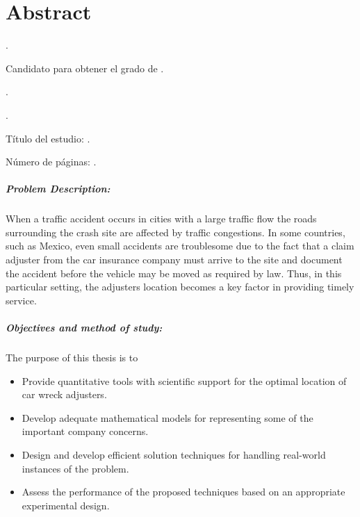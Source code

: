 
\chapter{Abstract}

{\setlength{\leftskip}{10mm}
\setlength{\parindent}{-10mm}

\autor.

Candidato para obtener el grado de \grado\orientacion.

\uanl.

\fime.

Título del estudio: \textsc{\titulo}.

\noindent Número de páginas: \pageref*{lastpage}.}

\paragraph{Problem Description:}
When a traffic accident occurs
in cities with a large traffic flow
the roads surrounding the crash site
are affected by traffic congestions.
In some countries, such as Mexico,
even small accidents are troublesome
due to the fact
that a claim adjuster
from the car insurance company
must arrive to the site
and document the accident
before the vehicle may be moved
as required by law.
Thus,
in this particular setting,
the adjusters location
becomes a key factor in providing timely service.

\paragraph{Objectives and method of study:}
The purpose of this thesis is to
\begin{itemize}
\item Provide quantitative tools
with scientific support
for the optimal location
of car wreck adjusters.
\item Develop
adequate mathematical models
for representing
some of the important company concerns.
\item Design and develop efficient solution techniques
for handling real-world instances of the problem.
\item Assess
the performance of the proposed techniques
based on an appropriate experimental design.
\end{itemize}

